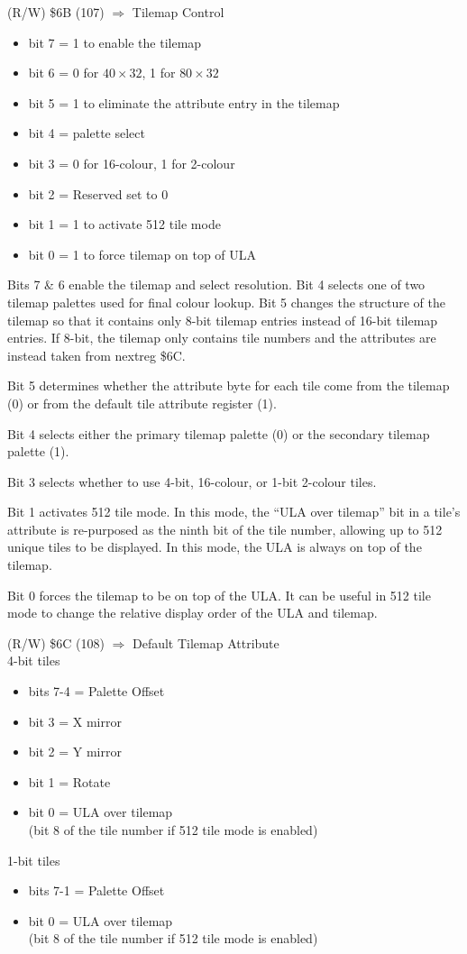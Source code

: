 (R/W) \$6B (107) $\Rightarrow$ Tilemap Control
\begin{itemize}
\item[] bit 7    = 1 to enable the tilemap
\item[] bit 6    = 0 for $40\times32$, 1 for $80\times32$
\item[] bit 5    = 1 to eliminate the attribute entry in the tilemap
\item[] bit 4    = palette select
\item[] bit 3    = 0 for 16-colour, 1 for 2-colour
\item[] bit 2    = Reserved set to 0
\item[] bit 1    = 1 to activate 512 tile mode
\item[] bit 0    = 1 to force tilemap on top of ULA
\end{itemize}

Bits 7 \& 6 enable the tilemap and select resolution. Bit 4 selects one
of two tilemap palettes used for final colour lookup. Bit 5 changes
the structure of the tilemap so that it contains only 8-bit tilemap
entries instead of 16-bit tilemap entries. If 8-bit, the tilemap only
contains tile numbers and the attributes are instead taken from
nextreg \$6C.

Bit 5 determines whether the attribute byte for each tile come from
the tilemap (0) or from the default tile attribute register (1).

Bit 4 selects either the primary tilemap palette (0) or the secondary
tilemap palette (1).

Bit 3 selects whether to use 4-bit, 16-colour, or 1-bit 2-colour
tiles.

Bit 1 activates 512 tile mode. In this mode, the “ULA over tilemap”
bit in a tile’s attribute is re-purposed as the ninth bit of the tile
number, allowing up to 512 unique tiles to be displayed. In this mode,
the ULA is always on top of the tilemap.

Bit 0 forces the tilemap to be on top of the ULA. It can be useful in
512 tile mode to change the relative display order of the ULA and
tilemap.

(R/W) \$6C (108) $\Rightarrow$ Default Tilemap Attribute\\
4-bit tiles
\begin{itemize}
\item[] bits 7-4 = Palette Offset
\item[] bit 3    = X mirror
\item[] bit 2    = Y mirror
\item[] bit 1    = Rotate
\item[] bit 0    = ULA over tilemap\\
  (bit 8 of the tile number if 512 tile mode is enabled)
\end{itemize}
1-bit tiles
\begin{itemize}
\item[] bits 7-1 = Palette Offset
\item[] bit 0    = ULA over tilemap\\
  (bit 8 of the tile number if 512 tile mode is enabled)
\end{itemize}

